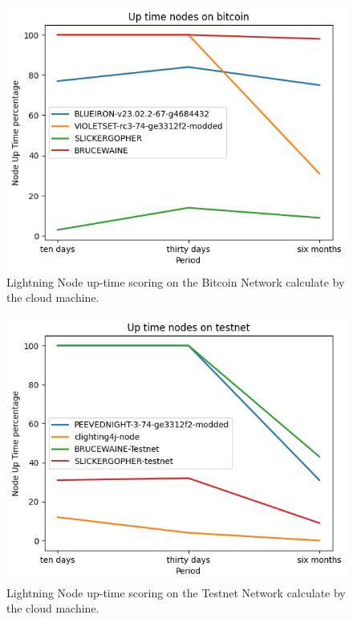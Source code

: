 \begin{figure}
    \begin{center}
      \includegraphics[scale=0.7]{imgs/bitcoin_uptime.png}
    \end{center}
    \caption{Lightning Node up-time scoring on the Bitcoin Network calculate by the cloud machine.}
    \label{fig:lnmetrics_uptime_bitcoin}
\end{figure}

\begin{figure}
    \begin{center}
      \includegraphics[scale=0.7]{imgs/testnet_uptime.png}
    \end{center}
    \caption{Lightning Node up-time scoring on the Testnet Network calculate by the cloud machine.}
    \label{fig:lnmetrics_uptime_testnet}
\end{figure}

